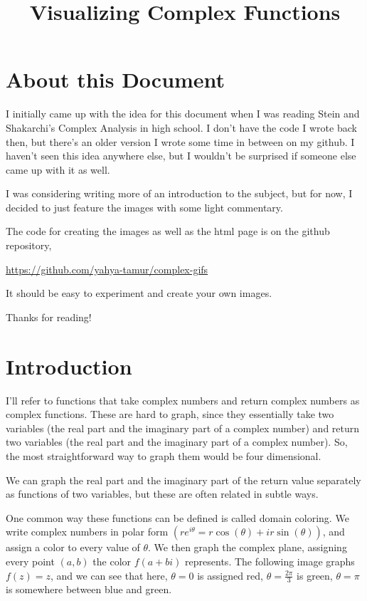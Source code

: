 \documentclass[xhtml, mathjax]{article}
\title{Visualizing Complex Functions}
\author{}
\date{}
\begin{document}
  \EndCssFile

  \section{About this Document}

    I initially came up with the idea for this document when I was reading Stein
    and Shakarchi's Complex Analysis in high school. I don't have the code I
    wrote back then, but there's an older version I wrote some time in between
    on my github. I haven't seen this idea anywhere else, but I wouldn't be
    surprised if someone else came up with it as well.

    I was considering writing more of an introduction to the subject, but for
    now, I decided to just feature the images with some light commentary.

    The code for creating the images as well as the html page is on the github
    repository,

    \url{https://github.com/yahya-tamur/complex-gifs}

    It should be easy to experiment and create your own images.

    Thanks for reading!

  \section{Introduction}

    I'll refer to functions that take complex numbers and return complex numbers
    as complex functions. These are hard to graph, since they essentially take
    two variables (the real part and the imaginary part of a complex number) and
    return two variables (the real part and the imaginary part of a complex
    number). So, the most straightforward way to graph them would be four
    dimensional.

    We can graph the real part and the imaginary part of the return value
    separately as functions of two variables, but these are often related in
    subtle ways.

    One common way these functions can be defined is called domain coloring. We
    write complex numbers in polar form $(re^{i\theta} = r\cos(\theta) +
    ir\sin(\theta))$, and assign a color to every value of $\theta$. We then
    graph the complex plane, assigning every point $(a,b)$ the color $f(a + bi)$
    represents. The following image graphs $f(z) = z$, and we can see that here,
    $\theta = 0$ is assigned red, $\theta = \frac{2\pi}{3}$ is green, $\theta =
    \pi$ is somewhere between blue and green.
\end{document}
